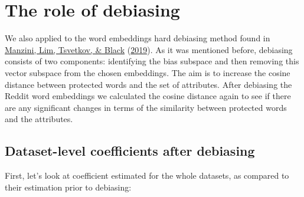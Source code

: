 \documentclass[
  12pt,
]{book}
\begin{document}
\hypertarget{the-role-of-debiasing}{%
\chapter{The role of debiasing}\label{the-role-of-debiasing}}

We also applied to the word embeddings hard debiasing method found in \protect\hyperlink{ref-Manzini2019blackToCriminal}{Manzini, Lim, Tsvetkov, \& Black} (\protect\hyperlink{ref-Manzini2019blackToCriminal}{2019}). As it was mentioned before, debiasing consists of two components: identifying the bias subspace and then removing this vector subspace from the chosen embeddings. The aim is to increase the cosine distance between protected words and the set of attributes.
After debiasing the Reddit word embeddings we calculated the cosine distance again to see if there are any significant changes in terms of the similarity between protected words and the attributes.

\hypertarget{dataset-level-coefficients-after-debiasing}{%
\section{Dataset-level coefficients after debiasing}\label{dataset-level-coefficients-after-debiasing}}

First, let's look at coefficient estimated for the whole datasets, as compared to their estimation prior to debiasing:
\end{document}
